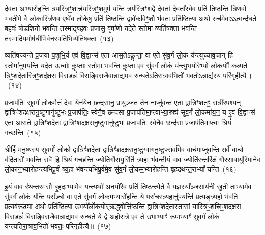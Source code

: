 दे॒वता॑ अ॒भ्यारो॑हन्ति त्रयस्त्रि॒ꣳ॒शात्त्र॑यस्त्रि॒ꣳ॒शमुप॑ यन्ति॒ त्रय॑स्त्रिꣳश॒द्वै दे॒वता॑ दे॒वता᳚स्वे॒व प्रति॑ तिष्ठन्ति त्रिण॒वो भ॑वती॒मे वै लो॒कास्त्रि॑ण॒व ए॒ष्वे॑व लो॒केषु॒ प्रति॑ तिष्ठन्ति॒ द्वावे॑कवि॒ꣳ॒शौ भ॑वतः॒ प्रति॑ष्ठित्या॒ अथो॒ रुच॑मे॒वा\-ऽऽ\-त्मन्द॑धते ब॒हवः॑ षोड॒शिनो॑ भवन्ति॒ तस्मा᳚द्ब॒हवः॑ प्र॒जासु॒ वृषा॑णो॒ यदे॒ते स्तोमा॒ व्यति॑षक्ता॒ भव॑न्ति॒ तस्मा॑दि॒यमोष॑धीभि॒र्वन॒स्पति॑भि॒र्व्यति॑षक्ता~(१३)

व्यति॑षज्यन्ते प्र॒जया॑ प॒शुभि॒र्य ए॒वं वि॒द्वाꣳस॑ ए॒ता आस॒ते\-ऽकॢ॑प्ता॒ वा ए॒ते सु॑व॒र्गं लो॒कं य॑न्त्युच्चाव॒चान् हि स्तोमा॑नुप॒यन्ति॒ यदे॒त ऊ॒र्ध्वाः कॢ॒प्ताः स्तोमा॒ भव॑न्ति कॢ॒प्ता ए॒व सु॑व॒र्गं लो॒कं य॑न्त्यु॒भयो॑रेभ्यो लो॒कयोः᳚ कल्पते त्रि॒ꣳ॒शदे॒तास्त्रि॒ꣳ॒शद॑क्षरा वि॒राडन्नं॑ वि॒राड्वि॒राजै॒वान्नाद्य॒मव॑ रुन्धते\-ऽतिरा॒त्राव॒भितो॑ भवतो॒\-ऽन्नाद्य॑स्य॒ परि॑गृहीत्यै॥~(१४)

{\anuvakamend[{ओष॑धीः संवथ्स॒र ए॒वाव॑ प्रति॒ष्ठाय॒ व्यति॑ष॒क्तैका॒न्नप॑ञ्चा॒शच्च॑}]}%

प्र॒जा\-प॑तिः सुव॒र्गं लो॒कमै॒त्तं दे॒वा येन॑येन॒ छन्द॒सानु॒ प्रायु॑ञ्जत॒ तेन॒ नाप्नु॑व॒न्त ए॒ता द्वात्रिꣳ॑शत॒ꣳ॒ रात्री॑रपश्य॒न् द्वात्रिꣳ॑शदक्षरानु॒ष्टुगानु॑ष्टुभः प्र॒जा\-प॑तिः॒ स्वेनै॒व छन्द॑सा प्र॒जा\-प॑तिमा॒प्त्वाभ्या॒रुह्य॑ सुव॒र्गं लो॒कमा॑य॒न्॒ य ए॒वं वि॒द्वाꣳस॑ ए॒ता आस॑ते॒ द्वात्रिꣳ॑शदे॒ता द्वात्रिꣳ॑शदक्षरानु॒ष्टुगानु॑ष्टुभः प्र॒जा\-प॑तिः॒ स्वेनै॒व छन्द॑सा प्र॒जा\-प॑तिमा॒प्त्वा श्रियं॑ गच्छन्ति~(१५)

श्रीर्\mbox{}हि म॑नु॒ष्य॑स्य सुव॒र्गो लो॒को द्वात्रिꣳ॑शदे॒ता द्वात्रिꣳ॑शदक्षरानु॒ष्टुग्वाग॑नु॒ष्टुफ्सर्वा॑मे॒व वाच॑माप्नुवन्ति॒ सर्वे॑ वा॒चो व॑दि॒तारो॑ भवन्ति॒ सर्वे॒ हि श्रियं॒ गच्छ॑न्ति॒ ज्योति॒र्गौरायु॒रिति॑ त्र्य॒हा भ॑वन्ती॒यं वाव ज्योति॑र॒न्तरि॑क्षं॒ गौर॒सावायु॑\-रि॒माने॒व लो॒कान॒भ्यारो॑हन्त्यभिपू॒र्वं त्र्य॒हा भ॑वन्त्यभिपू॒र्वमे॒व सु॑व॒र्गं लो॒कम॒भ्यारो॑हन्ति बृहद्रथन्त॒रा\-भ्यां᳚ यन्ति~(१६)

इ॒यं वाव र॑थन्त॒रम॒सौ बृ॒हदा॒भ्यामे॒व य॒न्त्यथो॑ अ॒नयो॑रे॒व प्रति॑ तिष्ठन्त्ये॒ते वै य॒ज्ञस्या᳚ञ्ज॒साय॑नी स्रु॒ती ताभ्या॑मे॒व सु॑व॒र्गं लो॒कं य॑न्ति॒ परा᳚ञ्चो॒ वा ए॒ते सु॑व॒र्गं लो॒कम॒भ्यारो॑हन्ति॒ ये परा॑चस्त्र्य॒हानु॑प॒यन्ति॑ प्र॒त्यङ्त्र्य॒हो भ॑वति॒ प्र॒त्यव॑रूढ्या॒ अथो॒ प्रति॑ष्ठित्या उ॒भयो᳚र्लो॒कयोर्॑\mbox{}॑ऋद्ध्वोत्ति॑ष्ठन्ति॒ द्वात्रिꣳ॑शदे॒तास्तासां॒ यास्त्रि॒ꣳ॒शत्त्रि॒ꣳ॒शद॑क्षरा वि॒राडन्नं॑ वि॒राड्वि॒राजै॒वान्नाद्य॒मव॑ रुन्धते॒ ये द्वे अ॑होरा॒त्रे ए॒व ते उ॒भाभ्याꣳ॑ रू॒पाभ्याꣳ॑ सुव॒र्गं लो॒कं य॑न्त्यतिरा॒त्राव॒भितो॑ भवतः॒ परि॑गृहीत्यै॥~(१७)

{\anuvakamend[{ग॒च्छ॒न्ति॒ य॒न्ति॒ त्रि॒ꣳ॒शद॑क्षरा॒ द्वाविꣳ॑शतिश्च}]}%

